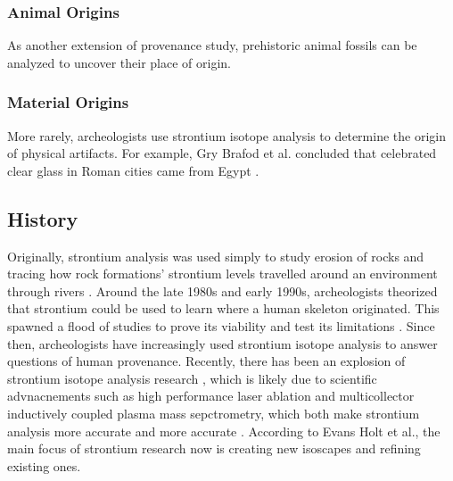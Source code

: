 \documentclass[a4paper, 12pt]{article}
\begin{document}
\subsubsection{Animal Origins}
As another extension of provenance study, prehistoric animal fossils can be analyzed
to uncover their place of origin.

\subsubsection{Material Origins}
More rarely, archeologists use strontium isotope analysis to determine the origin
of physical artifacts. For example, Gry Brafod et al. concluded that celebrated
clear glass in Roman cities came from Egypt \citep{barfod2020}.


\subsection{History}
Originally, strontium analysis was used simply to study erosion of rocks and
tracing how rock formations' strontium levels travelled around an environment
through rivers \citep{crowley2017}. Around the late 1980s and early 1990s, archeologists theorized
that strontium could be used to learn where a human skeleton originated. This spawned
a flood of studies to prove its viability and test its limitations \citep{crowley2017}.
Since then, archeologists have increasingly used strontium isotope analysis to answer
questions of human provenance. Recently, there has been an explosion of strontium
isotope analysis research \citep{crowley2017}, which is likely due to scientific
advnacnements such as high performance laser ablation and multicollector inductively coupled
plasma mass sepctrometry, which both make strontium analysis more accurate and more accurate \citep{holt2021}.
According to Evans Holt et al., the main focus of strontium research now is creating new isoscapes
and refining existing ones.
\end{document}
